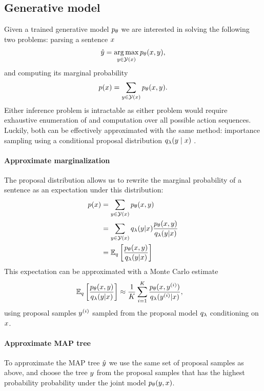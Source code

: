 \subsection{Generative model}
Given a trained generative model $p_{\theta}$ we are interested in solving the following two problems: parsing a sentence $x$
\begin{align*}
  \hat{y} = \operatorname*{arg\,max}_{ y \in \mathcal{Y}(x) } p_{\theta}(x, y),
\end{align*}
and computing its marginal probability
\begin{align*}
  p(x) = \sum_{ y \in \mathcal{Y}(x) } p_{\theta}(x, y).
\end{align*}
Either inference problem is intractable as either problem would require exhaustive enumeration of and computation over all possible action sequences.  Luckily, both can be effectively approximated with the same method: importance sampling using a conditional proposal distribution $q_{\lambda}(y \mid x)$ \citep{dyer2016rnng}.

\paragraph{Approximate marginalization}
The proposal distribution allows us to rewrite the marginal probability of a sentence as an expectation under this distribution:
\begin{align*}
  p (x)
    &= \sum_{y  \in \mathcal{Y}(x)} p_{\theta}(x, y) \\
    &= \sum_{y  \in \mathcal{Y}(x)} q_{\lambda}(y |x) \frac{p_{\theta}(x,y )}{q_{\lambda}(y | x)} \\
    &= \operatorname{\mathbb{E}}_{q} \bigg[\frac{p_{\theta}(x,y )}{q_{\lambda}(y | x)} \bigg] \\
\end{align*}
This expectation can be approximated with a Monte Carlo estimate
\begin{align}
  \operatorname{\mathbb{E}}_{q} \bigg[\frac{p_{\theta}(x,y )}{q_{\lambda}(y | x)} \bigg]
    &\approx \frac{1}{K}\sum_{i=1}^K  \frac{p_{\theta}( x, y^{(i)} )}{q_{\lambda}(y^{(i)} | x)},
\end{align}
using proposal samples $y^{(i)}$ sampled from the proposal model $q_{\lambda}$ conditioning on $x$.

\paragraph{Approximate MAP tree}
To approximate the MAP tree $\hat{y}$ we use the same set of proposal samples as above, and choose the tree $y$ from the proposal samples that has the highest probability probability under the joint model $p_{\theta}( y, x)$.

